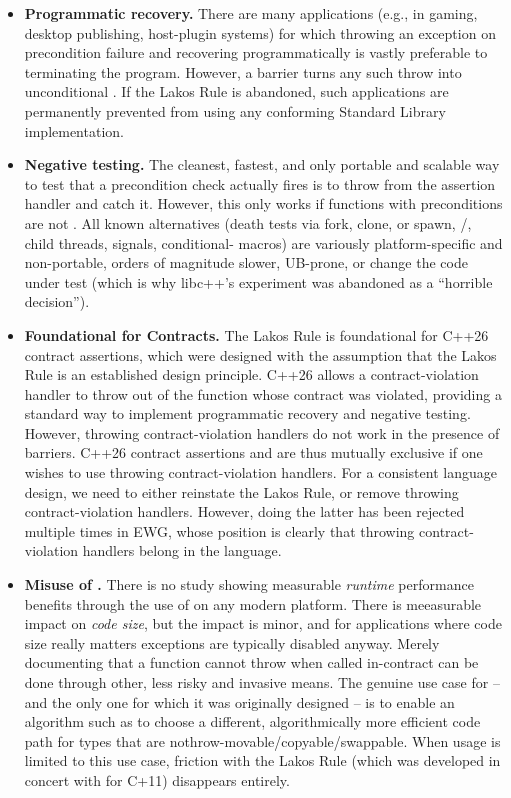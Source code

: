\begin{itemize}
\item \textbf{Programmatic recovery.} There are many applications (e.g., in gaming, desktop publishing, host-plugin systems) for which throwing an exception on precondition failure and recovering programmatically is vastly preferable to terminating the program. However, a  barrier turns any such throw into unconditional . If the Lakos Rule is abandoned, such applications are permanently prevented from using any conforming Standard Library implementation. 
\item \textbf{Negative testing.} The cleanest, fastest, and only portable and scalable way to test that a precondition check actually fires is to throw from the assertion handler and catch it. However, this only works if functions with preconditions are not . All known alternatives (death tests via fork, clone, or spawn, /, child threads, signals, conditional- macros) are variously platform-specific and non-portable, orders of magnitude slower, UB-prone, or change the code under test (which is why libc++'s  experiment was abandoned as a ``horrible decision'').
\item \textbf{Foundational for Contracts.} The Lakos Rule is foundational for C++26 contract assertions, which were designed with the assumption that the Lakos Rule is an established design principle. C++26 allows a contract-violation handler to throw out of the function whose contract was violated, providing a standard way to implement programmatic recovery and negative testing. However, throwing contract-violation handlers do not work in the presence of  barriers. C++26 contract assertions and  are thus mutually exclusive if one wishes to use throwing contract-violation handlers. For a consistent language design, we need to either reinstate the Lakos Rule, or remove throwing contract-violation handlers. However, doing the latter has been rejected multiple times in EWG, whose position is clearly that throwing contract-violation handlers belong in the language.
\item \textbf{Misuse of .} There is no study showing measurable \emph{runtime} performance benefits through the use of  on any modern platform. There is meeasurable impact on \emph{code size}, but the impact is minor, and for applications where code size really matters exceptions are typically disabled anyway. Merely documenting that a function cannot throw when called in-contract can be done through other, less risky and invasive means. The  genuine use case for  -- and the only one for which it was originally designed -- is to enable an algorithm such as  to choose a different, algorithmically more efficient code path for types that are nothrow-movable/copyable/swappable. When  usage is limited to this use case, friction with the Lakos Rule (which was developed in concert with  for C+11) disappears entirely.
\end{itemize}

